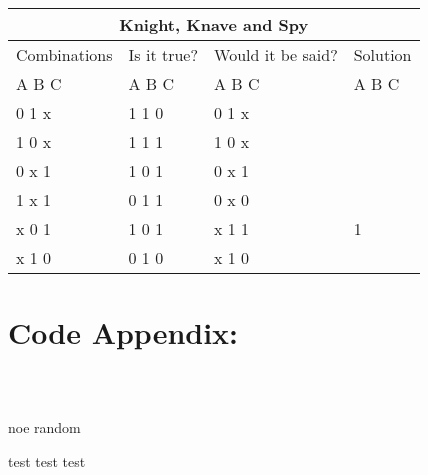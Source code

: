 \documentclass[11pt]{amsart}
\begin{document}
	\begin{tabular}{ |p{3cm}||p{3cm}|p{3cm}|p{3cm}|  }
	 \hline
	 \multicolumn{4}{|c|}{Knight, Knave and Spy} \\
	 \hline
	 Combinations & Is it true? & Would it be said? & Solution  \\ A  B  C   &   A  B  C  &   A  B  C & A  B  C \\
	 \hline
	  0   1   x  	& 1	1	0   & 0 1 x	&  \\
	  1   0   x		& 1	1	1  	& 1 0 x &  \\
	  0   x   1 	&	1	0	1 	& 0 x 1	&  \\
	  1   x   1  	&	0	1	1 	& 0 x 0	&  \\
	  x   0   1		& 1	0	1  	& x 1 1	& 1\\
	  x   1   0		& 0	1	0  	& x 1 0 &  \\

	 \hline
	\end{tabular}


\section{Code Appendix:}

\begin{verbatim}



\end{verbatim}






noe random


test
test
test
\end{document}
